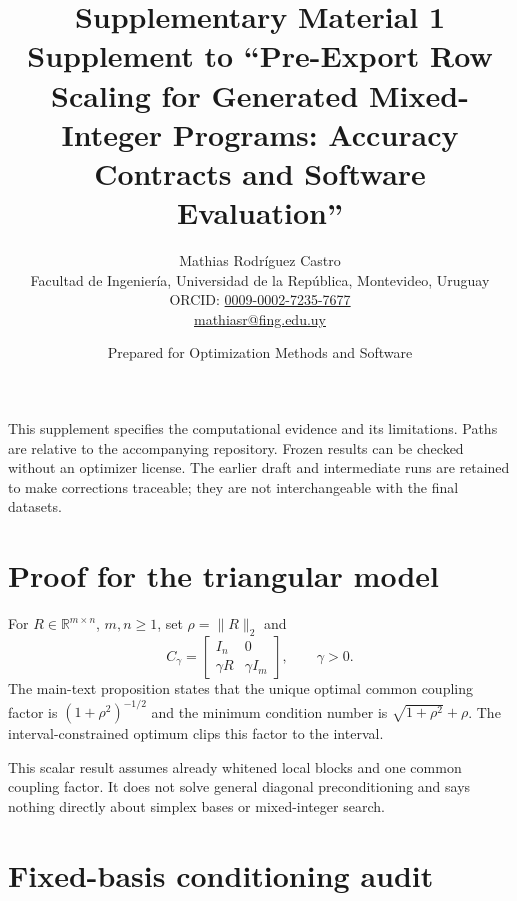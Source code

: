 \documentclass[11pt]{article}
\title{Supplementary Material 1\\\large Supplement to ``Pre-Export Row Scaling for Generated Mixed-Integer Programs: Accuracy Contracts and Software Evaluation''}
\author{Mathias Rodr\'iguez Castro\\\small Facultad de Ingenier\'ia, Universidad de la Rep\'ublica, Montevideo, Uruguay\\\small ORCID: \href{https://orcid.org/0009-0002-7235-7677}{0009-0002-7235-7677}\\\small\href{mailto:mathiasr@fing.edu.uy}{mathiasr@fing.edu.uy}}
\date{Prepared for Optimization Methods and Software}
\begin{document}
\maketitle
This supplement specifies the computational evidence and its limitations. Paths are
relative to the accompanying repository. Frozen results can be checked without an
optimizer license. The earlier draft and intermediate runs are retained to make
corrections traceable; they are not interchangeable with the final datasets.

\section{Proof for the triangular model}
For $R\in\mathbb R^{m\times n}$, $m,n\ge1$, set $\rho=\|R\|_2$ and
\[
 C_\gamma=\begin{bmatrix}I_n&0\\\gamma R&\gamma I_m\end{bmatrix},\qquad \gamma>0.
\]
The main-text proposition states that the unique optimal common coupling factor is
$(1+\rho^2)^{-1/2}$ and the minimum condition number is $\sqrt{1+\rho^2}+\rho$.
The interval-constrained optimum clips this factor to the interval.

This scalar result assumes already whitened local blocks and one common coupling
factor. It does not solve general diagonal preconditioning and says nothing directly
about simplex bases or mixed-integer search.

\section{Fixed-basis conditioning audit}
\end{document}
